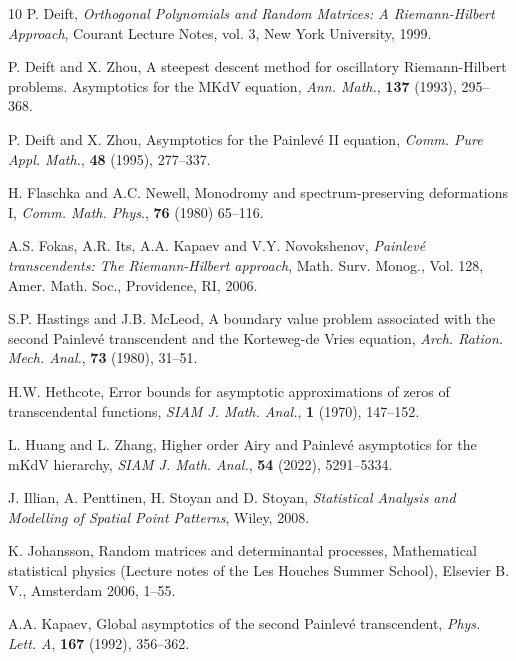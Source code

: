\documentclass[11pt,a4paper]{article}
\numberwithin{equation}{section}
\begin{document}
\begin{thebibliography}{10}
P. Deift, {\it Orthogonal Polynomials and Random Matrices: A Riemann-Hilbert Approach}, Courant Lecture Notes, vol. 3, New York University, 1999.

P. Deift and X. Zhou, A steepest descent method for oscillatory Riemann-Hilbert problems. Asymptotics for the MKdV equation, {\it Ann. Math.}, {\bf137} (1993), 295--368.

P. Deift and X. Zhou,  Asymptotics for the Painlev\'e II equation, {\it Comm. Pure Appl. Math.}, {\bf 48} (1995), 277--337.



 H. Flaschka and A.C. Newell, Monodromy and spectrum-preserving deformations I, {\it Comm. Math. Phys}., {\bf 76} (1980) 65--116.

A.S. Fokas, A.R. Its, A.A. Kapaev and V.Y. Novokshenov, {\it Painlev\'{e} transcendents: The Riemann-Hilbert approach}, Math. Surv. Monog., Vol. 128, Amer. Math. Soc., Providence, RI, 2006.

S.P. Hastings and J.B. McLeod, A boundary value problem associated with the second
Painlev\'{e} transcendent and the Korteweg-de Vries equation, {\it Arch. Ration. Mech. Anal.}, {\bf 73} (1980), 31--51.


H.W. Hethcote, Error bounds for asymptotic approximations of zeros of transcendental functions, {\it SIAM J. Math. Anal.}, {\bf 1} (1970), 147--152.

L. Huang and L. Zhang, Higher order Airy and Painlev\'{e} asymptotics for the mKdV hierarchy,  {\it SIAM J. Math. Anal.}, {\bf 54} (2022), 5291--5334.




J. Illian, A. Penttinen, H. Stoyan and D. Stoyan, {\it Statistical Analysis and Modelling of
Spatial Point Patterns}, Wiley, 2008.

K. Johansson, Random matrices and determinantal processes, Mathematical statistical
physics (Lecture notes of the Les Houches Summer School), Elsevier B. V., Amsterdam
2006, 1--55.

A.A. Kapaev, Global asymptotics of the second Painlev\'e transcendent, {\it Phys. Lett. A}, {\bf 167} (1992), 356--362.




\end{thebibliography}
\end{document}
